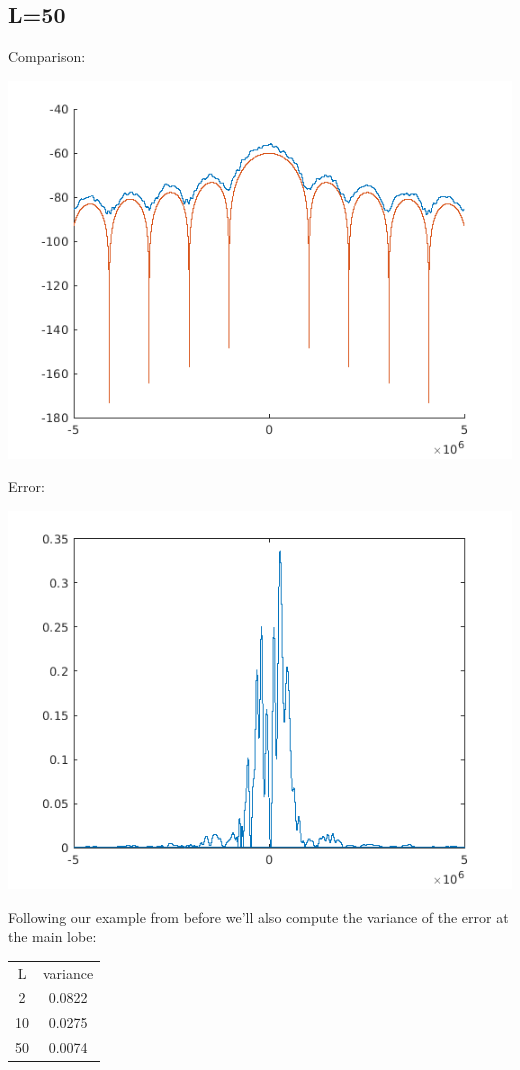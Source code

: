 \documentclass[conference,9pt]{IEEEtran}
\begin{document}
\subsection{L=50}
Comparison:

\includegraphics[scale=0.6]{barlett50.png}

Error:

\includegraphics[scale=0.6]{me50.png}

Following our example from before we'll also compute the variance of the error at the main lobe:

\begin{center}
  \begin{tabular}{ c c }
   L & variance \\
   2 &  0.0822 \\
   10 &  0.0275 \\
   50 & 0.0074    
  \end{tabular}
\end{center}
\end{document}

